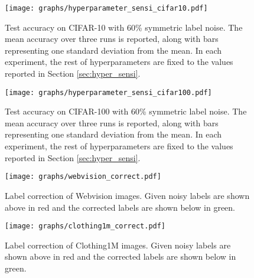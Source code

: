 \documentclass{article}
\begin{document}
\begin{figure}[t]
	\begin{center}
		\texttt{[image: graphs/hyperparameter\_sensi\_cifar10.pdf]}
	\end{center}
	\caption{Test accuracy on CIFAR-10 with 60\% symmetric label noise. The mean accuracy over three runs is reported, along with bars representing one standard deviation from the mean. In each experiment, the rest of hyperparameters are fixed to the values reported in Section \ref{sec:hyper_sensi}.}
	\label{fig:hyper_sensi}
\end{figure}

\begin{figure}[t]
	\begin{center}
		\texttt{[image: graphs/hyperparameter\_sensi\_cifar100.pdf]}
	\end{center}
	\caption{Test accuracy on CIFAR-100 with 60\% symmetric label noise. The mean accuracy over three runs is reported, along with bars representing one standard deviation from the mean. In each experiment, the rest of hyperparameters are fixed to the values reported in Section \ref{sec:hyper_sensi}.}
	\label{fig:hyper_sensi_cifar100}
\end{figure}



\begin{figure}[t]
	\begin{center}
		\texttt{[image: graphs/webvision\_correct.pdf]}
	\end{center}
	\caption{Label correction of Webvision images. Given noisy labels are shown above in red and the corrected labels are shown below in green.}
	\label{fig:webvision_correct}
\end{figure}

\begin{figure}[htb!]
	\begin{center}
		\texttt{[image: graphs/clothing1m\_correct.pdf]}
	\end{center}
	\caption{Label correction of Clothing1M images. Given noisy labels are shown above in red and the corrected labels are shown below in green.}
	\label{fig:clothing1M_correct}
\end{figure}
\end{document}
